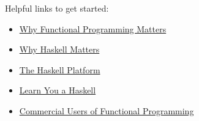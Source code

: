 \begin{frame}
  Helpful links to get started:

  \begin{itemize}
    \item \href{http://www.cse.chalmers.se/~rjmh/Papers/whyfp.pdf}{Why Functional Programming Matters}
    \item \href{http://haskell.org/haskellwiki/Why_Haskell_matters}{Why Haskell Matters}
    \item \href{http://hackage.haskell.org/platform/}{The Haskell Platform}
    \item \href{http://learnyouahaskell.com/}{Learn You a Haskell}
    \item \href{http://cufp.org/}{Commercial Users of Functional Programming}
  \end{itemize}
\end{frame}
